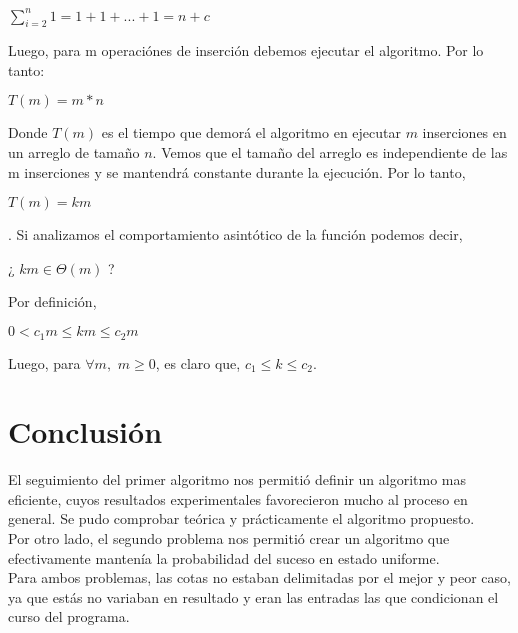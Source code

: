 \documentclass[11pt]{article}
\begin{document}
\begin{center}$\sum_{i=2}^{n}1 = 1 + 1 + ... + 1 = n + c$\end{center}
Luego, para m operaciónes de inserción debemos ejecutar el algoritmo. Por lo tanto:\\
\begin{center}$T(m) = m \ast n$\end{center} Donde $T(m)$ es el tiempo que demorá el algoritmo en ejecutar $m$ inserciones en un arreglo de tamaño $n$. Vemos que el tamaño del arreglo es independiente de las m inserciones y se mantendrá constante durante la ejecución. Por lo tanto, \\\begin{center}$T(m) = km$\end{center}.
Si analizamos el comportamiento asintótico de la función podemos decir,\\
\begin{center}¿ \(km \in \Theta(m) \) ?\end{center}
Por definición,\begin{center}$0 < c_1m \leq km \leq c_2m$ \end{center}
Luego, para $\forall m,$ $m\geq 0$, es claro que, $c_1\leq k \leq c_2$.

\section{Conclusión}
El seguimiento del primer algoritmo nos permitió definir un algoritmo mas eficiente, cuyos resultados experimentales favorecieron mucho al proceso en general. Se pudo comprobar teórica y prácticamente el algoritmo propuesto. \\Por otro lado, el segundo problema nos permitió crear un algoritmo que efectivamente mantenía la probabilidad del suceso en estado uniforme.\\Para ambos problemas, las cotas no estaban delimitadas por el mejor y peor caso, ya que estás no variaban en resultado y eran las entradas las que condicionan el curso del programa. 
\end{document}
